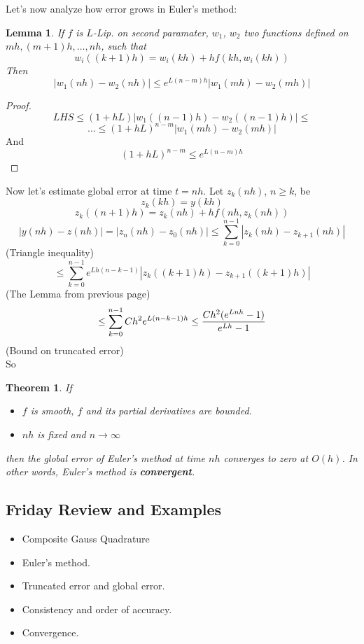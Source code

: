 \documentclass{article} %
\theoremstyle{break}
\newtheorem{lem}[definition]{Lemma}
\newtheorem{thm}[definition]{Theorem}
\begin{document}
Let's now analyze how error grows in Euler's method:

\begin{lem}
  If $f$ is $L$-Lip. on second paramater, $w_1$, $w_2$ two functions defined on $mh, (m+1)h, \dots, nh$, such that
  \[w_i((k+1)h)=w_i(kh)+hf(kh, w_i(kh))\]
  Then 
\[|w_1(nh)-w_2(nh)|\leq e^{L(n-m)h}|w_1(mh)-w_2(mh)|\]
\end{lem}

\begin{proof}
  \[LHS\leq (1+hL)|w_1((n-1)h)-w_2((n-1)h)|\leq\]
    \[\dots\leq (1+hL)^{n-m}|w_1(mh)-w_2(mh)|\]
 And \[(1+hL)^{n-m}\leq e^{L(n-m)h}\]
\end{proof}


Now let's estimate global error at time $t=nh$. Let $z_k(nh)$, $n\geq k$, be
\[z_k(kh)=y(kh)\]
\[z_k((n+1)h)=z_k(nh)+hf(nh, z_k(nh))\]
\[|y(nh)-z(nh)|=|z_{n}(nh)-z_{0}(nh)|\leq \sum_{k=0}^{n-1}|z_k(nh)-z_{k+1}(nh)|\]
(Triangle inequality)
\[\leq \sum_{k=0}^{n-1}e^{Lh(n-k-1)}|z_k((k+1)h)-z_{k+1}((k+1)h)|\]
(The Lemma from previous page)
\[\leq \sum_{k=0}^{n-1}Ch^2 e^{L(n-k-1)h}\leq {Ch^2(e^{Lnh}-1)\over e^{Lh}-1}\]
(Bound on truncated error)\\
So
\begin{thm}
If
\begin{itemize}
\item $f$ is smooth, $f$ and its partial derivatives are bounded.
\item $nh$ is fixed and $n\rightarrow\infty$
\end{itemize}
then the global error of Euler's method at time $nh$ converges to zero at $O(h)$. In other words, Euler's method is {\bf convergent}.
\end{thm}


\subsection{Friday Review and Examples}

\begin{itemize}
\item Composite Gauss Quadrature
\item Euler's method.
\item Truncated error and global error.
\item Consistency and order of accuracy.
\item Convergence.
\end{itemize}
\end{document}
